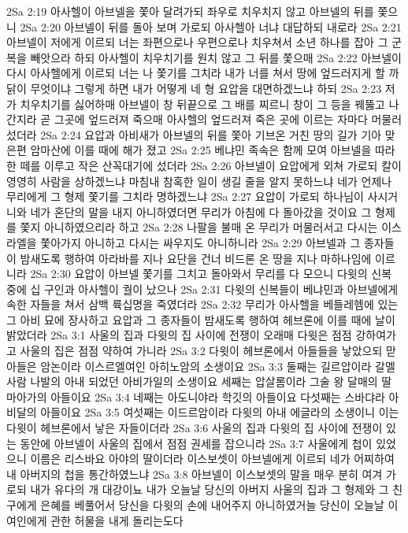 2Sa 2:19  아사헬이 아브넬을 쫓아 달려가되 좌우로 치우치지 않고 아브넬의 뒤를 쫓으니
2Sa 2:20  아브넬이 뒤를 돌아 보며 가로되 아사헬아 너냐 대답하되 내로라
2Sa 2:21  아브넬이 저에게 이르되 너는 좌편으로나 우편으로나 치우쳐서 소년 하나를 잡아 그 군복을 빼앗으라 하되 아사헬이 치우치기를 원치 않고 그 뒤를 쫓으매
2Sa 2:22  아브넬이 다시 아사헬에게 이르되 너는 나 쫓기를 그치라 내가 너를 쳐서 땅에 엎드러지게 할 까닭이 무엇이냐 그렇게 하면 내가 어떻게 네 형 요압을 대면하겠느냐 하되
2Sa 2:23  저가 치우치기를 싫어하매 아브넬이 창 뒤끝으로 그 배를 찌르니 창이 그 등을 꿰뚫고 나간지라 곧 그곳에 엎드러져 죽으매 아사헬의 엎드러져 죽은 곳에 이르는 자마다 머물러 섰더라
2Sa 2:24  요압과 아비새가 아브넬의 뒤를 쫓아 기브온 거친 땅의 길가 기아 맞은편 암마산에 이를 때에 해가 졌고
2Sa 2:25  베냐민 족속은 함께 모여 아브넬을 따라 한 떼를 이루고 작은 산꼭대기에 섰더라
2Sa 2:26  아브넬이 요압에게 외쳐 가로되 칼이 영영히 사람을 상하겠느냐 마침내 참혹한 일이 생길 줄을 알지 못하느냐 네가 언제나 무리에게 그 형제 쫓기를 그치라 명하겠느냐
2Sa 2:27  요압이 가로되 하나님이 사시거니와 네가 혼단의 말을 내지 아니하였더면 무리가 아침에 다 돌아갔을 것이요 그 형제를 쫓지 아니하였으리라 하고
2Sa 2:28  나팔을 불매 온 무리가 머물러서고 다시는 이스라엘을 쫓아가지 아니하고 다시는 싸우지도 아니하니라
2Sa 2:29  아브넬과 그 종자들이 밤새도록 행하여 아라바를 지나 요단을 건너 비드론 온 땅을 지나 마하나임에 이르니라
2Sa 2:30  요압이 아브넬 쫓기를 그치고 돌아와서 무리를 다 모으니 다윗의 신복 중에 십 구인과 아사헬이 궐이 났으나
2Sa 2:31  다윗의 신복들이 베냐민과 아브넬에게 속한 자들을 쳐서 삼백 륙십명을 죽였더라
2Sa 2:32  무리가 아사헬을 베들레헴에 있는 그 아비 묘에 장사하고 요압과 그 종자들이 밤새도록 행하여 헤브론에 이를 때에 날이 밝았더라
2Sa 3:1  사울의 집과 다윗의 집 사이에 전쟁이 오래매 다윗은 점점 강하여가고 사울의 집은 점점 약하여 가니라
2Sa 3:2  다윗이 헤브론에서 아들들을 낳았으되 맏아들은 암논이라 이스르엘여인 아히노암의 소생이요
2Sa 3:3  둘째는 길르압이라 갈멜 사람 나발의 아내 되었던 아비가일의 소생이요 세째는 압살롬이라 그술 왕 달매의 딸 마아가의 아들이요
2Sa 3:4  네째는 아도니야라 학깃의 아들이요 다섯째는 스바댜라 아비달의 아들이요
2Sa 3:5  여섯째는 이드르암이라 다윗의 아내 에글라의 소생이니 이는 다윗이 헤브론에서 낳은 자들이더라
2Sa 3:6  사울의 집과 다윗의 집 사이에 전쟁이 있는 동안에 아브넬이 사울의 집에서 점점 권세를 잡으니라
2Sa 3:7  사울에게 첩이 있었으니 이름은 리스바요 아야의 딸이더라 이스보셋이 아브넬에게 이르되 네가 어찌하여 내 아버지의 첩을 통간하였느냐
2Sa 3:8  아브넬이 이스보셋의 말을 매우 분히 여겨 가로되 내가 유다의 개 대강이뇨 내가 오늘날 당신의 아버지 사울의 집과 그 형제와 그 친구에게 은혜를 베풀어서 당신을 다윗의 손에 내어주지 아니하였거늘 당신이 오늘날 이 여인에게 관한 허물을 내게 돌리는도다
